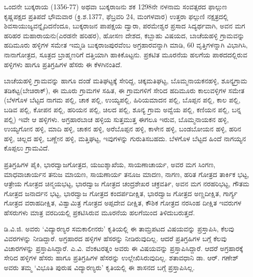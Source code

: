 \vskip -2pt

ಒಂದನೇ ಬುಕ್ಕರಾಯ (1356-77) ಅಥವಾ ಬುಕ್ಕರಾಜನು ಶಕ 1298ನೇ ನಳನಾಮ ಸಂವತ್ಸರದ ಫಾಲ್ಗುಣ ಕೃಷ್ಣಪಕ್ಷದ ಪ್ರತಿಪದೆ ಭೌಮವಾರ (ಕ್ರಿ.ಶ.1377, ಫೆಬ್ರವರಿ 24, ಮಂಗಳವಾರ) ಉತ್ತರಾ ಫಲ್ಗುಣಿ ನಕ್ಷತ್ರದಲ್ಲಿ ಶಿವ\break ಸಾಯುಜ್ಯವನ್ನೈದಿದನೆಂದೂ, ಬುಕ್ಕರಾಜನ ಪಾಪಕ್ಷಯ ದ್ವಾರಾ, ಪರಮೇಶ್ವರ ಪ್ರಸಾದ ಸಿದ್ಯರ್ಥವಾಗಿ, ಅವನ ಮಗ ಹರಿಹರ ಮಹಾರಾಯನು(ಎರಡನೇ ಹರಿಹರ), ಹೋಸಣ ದೇಶದ, ಕಬ್ಬಾಹು ವಿಷಯದ, ಬಾಚೆಯಹಳ್ಳಿ ಗ್ರಾಮವನ್ನು ಹದಿಮೂರು ಹಳ್ಳಿಗಳ ಸಮೇತ ಇಮ್ಮಡಿ ಬುಕ್ಕರಾಜಪುರವೆಂಬ ಅಗ್ರಹಾರವನ್ನಾಗಿ ಮಾಡಿ, 60 ವೃತ್ತಿಗಳನ್ನಾಗಿ ವಿಭಾಗಿಸಿ, ನಾನಾಗೋತ್ರದ, ಸೂತ್ರದ ಬ್ರಾಹ್ಮಣರಿಗೆ ದತ್ತಿಯಾಗಿ ಹಾಕಿಕೊಟ್ಟನು. ಪ್ರಕಟಿತ ಮೂರನೆಯ ಹಲಗೆಯ ಪಾಠದದಲ್ಲಿರುವ ಹಳ್ಳಿಗಳು ಹಾಗೂ ಪ್ರತಿಗ್ರಹಿಗಳ ಹೆಸರು ಈ ಕೆಳಗಿನಂತಿದೆ.

\vskip -2pt

ಬಾಚೆಯಹಳ್ಳಿ ಗ್ರಾಮವನ್ನು ಹಾಗೂ ದಂಡೆ ಮತಿಘಟ್ಟಕ್ಕೆ ಸೇರಿದ್ದ, ಚಿಕ್ಕಮತಿಘಟ್ಟ, ಬೊಮ್ಮನಾಯಕನಹಳ್ಳಿ, ಶೂನ್ಯಗ್ರಾಮ ತಡಿಕಟ್ಟ(ಬೇಚಿರಾಕ್​), ಈ ಮೂರು ಗ್ರಾಮಗಳ ಸಹಿತ, ಈ ಗ್ರಾಮಗಳಿಗೆ ಸೇರಿದ ಹದಿಮೂರು ಕಾಲುವಳ್ಳಿಗಳ ಸಮೇತ (ಬೆಳಗೊಳ ಬೆಟ್ಟದ ನಾಗಮ ಪಲ್ಲಿ, ಚಾಕ ಪಲ್ಲಿ, ಉಯ್ಯಪಲ್ಲಿ, ಹಿರಿಯಮಾದನ ಪಲ್ಲಿ, ಬೊಪ್ಪನ ಪಲ್ಲಿ, ಕಾಲ ಪಲ್ಲಿ, ಬಡಿವ ಪಲ್ಲಿ, ಕೋಪನ ಪಲ್ಲಿ, ಹರಿಯನ ಪಲ್ಲಿ, ಚಿಲದ ಪಲ್ಲಿ, ಶೂನ್ಯ ಗ್ರಾಮ ಅವ್ವೆಯ ಪಲ್ಲಿ, ಕಣಿಯನ ಪಲ್ಲಿ, ಬನ್ನ ಪಲ್ಲಿ) ಇವೇ ಆ ಹಳ್ಳಿಗಳು. ಅಗ್ರಹಾರಬಾಚ ಹಳ್ಳಿಯ ಸುತ್ತಮುತ್ತ ಈಗಲೂ ಇರುವ, ಬೊಮ್ಮನಾಯಕನ ಹಳ್ಳಿ, ಉಯ್ಯಗೋನ ಹಳ್ಳಿ, ಮಾದಿ ಹಳ್ಳಿ, ಚಾಕನ ಹಳ್ಳಿ, ಅರೆಬೊಪ್ಪನ ಹಳ್ಳಿ, ಕಾಳೇನ ಹಳ್ಳಿ, ಬಂಡಬೋಯನ ಹಳ್ಳಿ, ಹರಿನ ಹಳ್ಳಿ, ಚಿಲ್ಲದ ಹಳ್ಳಿ, ಬಣ್ಣೇನ ಹಳ್ಳಿ, ಮತ್ತಿಘಟ್ಟ, ಇವುಗಳನ್ನು ಗುರುತಿಸಬಹದು. ಬೆಳಗೊಳ ಬೆಟ್ಟದ ಹಿಂದೆ ನಾಗಯ್ಯನ ಕೊಪ್ಪಲು ಗ್ರಾಮವಿದೆ.

\vskip -2pt

ಪ್ರತಿಗ್ರಹಿಗಳ ಪೈಕಿ, ಭಾರದ್ವಾಜಗೋತ್ರದ, ಯಜುಶ್ಶಾಖೆಯ, ಸಾಯಣಾಚಾರ್ಯ, ಅವರ ಮಗ ಸಿಂಗಣ, ಮಾಧವಾಚಾರ್ಯನ ತನುಜ ಮಾಯಣ, ಸಾಯಣಾರ್ಯ ತನೂಜ ಮಾದಣ, ನಾಗಣ, ಹರಿತ ಗೋತ್ರದ ತಾರ್ಕಿಕ ಭಟ್ಟ, ಆತ್ರೇಯ ಗೋತ್ರದ ಚಿನ್ಮಯಭಟ್ಟ, ಭಾರದ್ವಾಜ ಗೋತ್ರದ ಚಂದ್ರಶೇಖರ ಚಕ್ರವರ್ತಿ, ಅವನ ಮಗ ನರಹರಿಭಟ್ಟ, ಗೌತಮ ಗೋತ್ರದ ಜನಾರ್ದನ ಭಟ್ಟ, ಭಾರದ್ವಾಜ ಗೋತ್ರದ ಕಂದರ್ಪದೀಕ್ಷಿತ, ಭಾರದ್ವಾಜ ಗೋತ್ರದ ಅಣ್ಣದೀಕ್ಷಿತ, ಗಾರ್ಗ್ಯ ಗೋತ್ರದ ವರಾಹದೀಕ್ಷಿತ, ವಿಶ್ವಾಮಿತ್ರ ಗೋತ್ರದ ಅಪ್ಪದೇವ ದೀಕ್ಷಿತ, ಕೌಶಿಕ ಗೋತ್ರದ ನರಸಿಂಹ ದೀಕ್ಷಿತ ಇವರುಗಳ ಹೆಸರುಗಳು ಮಾತ್ರ ವರದಿಯಲ್ಲಿ ಪ್ರಕಟಿಸಿರುವ ಮೂರನೆಯ ಹಲಗೆಯಿಂದ ತಿಳಿದುಬರುತ್ತದೆ.

ಡಿ.ವಿ.ಜಿ. ಅವರು ‘ವಿದ್ಯಾರಣ್ಯರ ಸಮಕಾಲೀನರು’ ಕೃತಿಯಲ್ಲಿ ಈ ತಾಮ್ರಪಟದ ವಿಷಯವನ್ನು ಪ್ರಸ್ತಾಪಿಸಿ, ಕೆಲವು ವಿವರಗಳನ್ನು ನೀಡಿದ್ದಾರೆ. ಅಗ್ರಹಾರದ ಹಳ್ಳಿಗಳ ಹೆಸರನ್ನು ನೀಡಿರುವುದಿಲ್ಲ. ಆದರೆ ಪ್ರತಿಗ್ರಹಿಗಳ ಬಗ್ಗೆ ಕೆಲವು ವಿಚಾರಗಳನ್ನು ಪ್ರಸ್ತಾಪಿಸಿದ್ದಾರೆ. ಎ.ವಿ. ವೆಂಕಟರತ್ನಂ ಅವರು ಈ ವಿಷಯವನ್ನು ಪ್ರಸ್ತಾಪಿಸಿದ್ದಾರೆ. ಆದರೆ ಅಗ್ರಹಾರಕ್ಕೆ ಸೇರಿದ ಹಳ್ಳಿಗಳ ಹೆಸರು ಹಾಗೂ ಪ್ರತಿಗ್ರಹಿಗಳ ಹೆಸರನ್ನು ಉಲ್ಲೇಖಿಸಿರುವುದಿಲ್ಲ. ಶತಾವಧಾನಿ ಡಾ. ಆರ್​. ಗಣೇಶ್​ ಅವರು ತಮ್ಮ ‘ವಿಭೂತಿ ಪುರುಷ ವಿದ್ಯಾರಣ್ಯರು’ ಕೃತಿಯಲ್ಲಿ ಈ ಶಾಸನದ ಬಗ್ಗೆ ಪ್ರಸ್ತಾಪಿಸಿಲ್ಲ.

